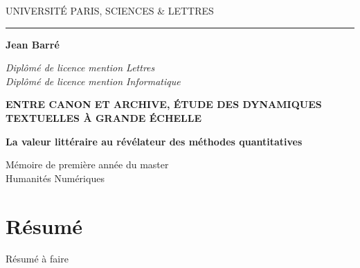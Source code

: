 \documentclass[a4paper,twoside,12pt]{book}
\begin{document}
\frontmatter

\begin{titlepage}
\begin{center}

\bigskip

\begin{large}
UNIVERSITÉ PARIS, SCIENCES \& LETTRES
\end{large}

\begin{center}\rule{2cm}{0.02cm}\end{center}

\bigskip
\bigskip
\bigskip
\begin{Large}
\textbf{Jean Barré}\\
\end{Large}
\begin{normalsize}
\textit{Diplômé de licence mention Lettres}\\
\textit{Diplômé de licence mention Informatique}\\
\end{normalsize}

\bigskip
\bigskip
\bigskip

\begin{Huge}
\textbf{ENTRE CANON ET ARCHIVE, ÉTUDE DES DYNAMIQUES TEXTUELLES À GRANDE ÉCHELLE}\\
\end{Huge}

\bigskip
\bigskip
\begin{LARGE}
\textbf{La valeur littéraire au révélateur des méthodes quantitatives}\\
\end{LARGE}

\bigskip
\bigskip
\bigskip
\vfill

\begin{large}
Mémoire de première année du master\\
\og Humanités Numériques \fg{} \\
\end{large}

\end{center}
\end{titlepage}


\section*{Résumé}

Résumé à faire
\end{document}
